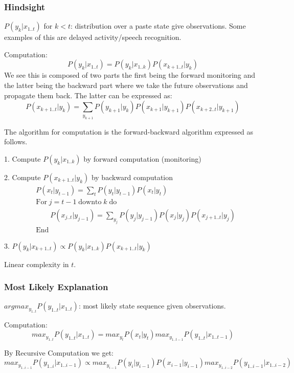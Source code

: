 \documentclass[12pt]{article}
\begin{document}
        \subsubsection{Hindsight}
            $P(y_k|x_{1..t})$ for $k < t$: distribution over a paste state give observations. Some examples of this
            are delayed activity/speech recognition.

            Computation:
            $$ P(y_k|x_{1..t}) = P(y_k|x_{1..k})P(x_{k+1..t}|y_k) $$
            We see this is composed of two parts the first being the forward monitoring and the latter being the 
            backward part where we take the future observations and propagate them back. The latter can be expressed as:
            $$ P(x_{k+1..t}|y_k) = \sum_{y_{k+1}} P(y_{k+1}|y_k) P(x_{k+1}|y_{k+1})P(x_{k+2..t}|y_{k+1}) $$

            The algorithm for computation is the forward-backward algorithm expressed as follows.
            
            1. Compute $P(y_k|x_{1..k})$ by forward computation (monitoring)

            2. Compute $P(x_{k+1..t}|y_k)$ by backward computation
            \begin{align*}
                & P(x_t|y_{t-1}) = \sum_t P(y_t|y_{t-1})P(x_t|y_t) \\
                & \text{For} \; j=t-1 \; \text{downto} \; k \; \text{do} \\
                & \qquad P(x_{j..t}|y_{j-1}) = \sum_{y_j} P(y_j|y_{j-1}) P(x_{j}|y_{j})P(x_{j+1..t}|y_{j}) \\
                & \text{End}
            \end{align*}
            
            3. $P(y_k|x_{k+1..t}) \propto P(y_k|x_{1..k})P(x_{k+1..t}|y_k)$

            Linear complexity in $t$.
        
        \subsubsection{Most Likely Explanation}
            $argmax_{y_{1..t}} P(y_{1..t}|x_{1..t})$: most likely state sequence given observations.

            Computation:
            $$ max_{y_{1..t}} P(y_{1..t}|x_{1..t}) = max_{y_t} P(x_t|y_t) max_{y_{1..t-1}} P(y_{1..t}|x_{1..t-1}) $$

            By Recursive Computation we get:
            $$ max_{y_{1..i-1}} P(y_{1..i}|x_{1..i-1}) \propto max_{y_{i-1}} P(y_i|y_{i-1})P(x_{i-1}|y_{i-1})
            max_{y_{1..i-2}} P(y_{1..i-1}|x_{1..i-2}) $$ 
        
\end{document}
